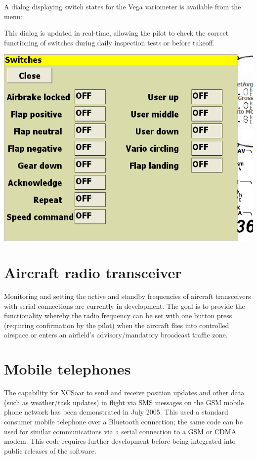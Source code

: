 \documentclass[a4paper,12pt]{refrep}
\begin{document}
A dialog displaying switch states for the Vega variometer
is available from the menu:
\begin{quote}
\blink{}\blink{}\blink{}
\end{quote}

This dialog is updated in real-time, allowing the pilot
to check the correct functioning of switches during daily
inspection tests or before takeoff. 

\begin{center}
\includegraphics[angle=0,width=\linewidth,keepaspectratio='true']{figures/dialog-switches.png}
\end{center}

\section{Aircraft radio transceiver}

Monitoring and setting the active and standby frequencies of aircraft
transceivers with serial connections are currently in development.
The goal is to provide the functionality whereby the radio frequency
can be set with one button press (requiring confirmation by the pilot)
when the aircraft flies into controlled airspace or enters an
airfield's advisory/mandatory broadcast traffic zone.

\section{Mobile telephones}

The capability for XCSoar to send and receive position updates and
other data (such as weather/task updates) in flight via SMS messages
on the GSM mobile phone network has been demonstrated in July 2005.
This used a standard consumer mobile telephone over a Bluetooth
connection; the same code can be used for similar communications via a
serial connection to a GSM or CDMA modem.  This code requires further
development before being integrated into public releases of the
software.
\end{document}
